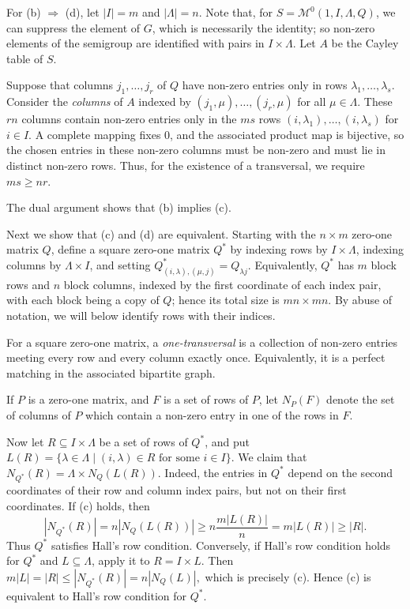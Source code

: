 \documentclass[11pt]{article}
\theoremstyle{plain}
\theoremstyle{remark}
\theoremstyle{definition}
\theoremstyle{plain}
\begin{document}
For (b) $\Rightarrow$ (d), let $|I|=m$ and $|\Lambda|=n$. Note
that, for $S=\mathcal{M}^0(1,I,\Lambda,Q)$, we can suppress the element of $G$,
which is necessarily the identity; so non-zero elements of the semigroup are identified with pairs in
$I\times\Lambda$. Let $A$ be the Cayley table of $S$.

Suppose that columns $j_1,\ldots,j_r$ of $Q$ have non-zero entries only in rows
$\lambda_1,\ldots,\lambda_s$. Consider the \emph{columns} of $A$ indexed
by $(j_1,\mu),\ldots,(j_r,\mu)$ for all $\mu\in\Lambda$. These $rn$ columns
contain non-zero entries only in the $ms$ rows $(i,\lambda_1),\ldots,(i,\lambda_s)$
for $i\in I$. A complete mapping fixes $0$, and the associated product map is
bijective, so the chosen entries in these non-zero columns must be non-zero and
must lie in distinct non-zero rows. Thus, for the existence of a transversal, we
require $ms\ge nr$.

The dual argument shows that (b) implies (c).

Next we show that (c) and (d) are equivalent. Starting with the
$n\times m$ zero-one matrix $Q$, define a square zero-one matrix $Q^*$ by indexing rows by $I\times\Lambda$, indexing columns by
$\Lambda\times I$, and setting
\(Q^*_{(i,\lambda),(\mu,j)}=Q_{\lambda j}.\)
Equivalently, $Q^*$ has $m$ block rows and $n$ block columns, indexed by the first coordinate of each index pair, with each block being
a copy of $Q$; hence its total size is $mn\times mn$. By abuse of notation, we will below identify rows with their indices.

For a square zero-one matrix, a \emph{one-transversal} is a collection of non-zero entries meeting every row and every column exactly once. Equivalently, it is a perfect matching in the associated bipartite graph.

If $P$ is a zero-one matrix, and $F$ is a set of rows of $P$, let $N_P(F)$ denote the set of columns of $P$ which contain a non-zero entry in
one of the rows in $F$.

Now let $R\subseteq I\times\Lambda$ be a set of rows of $Q^*$, and put
\(L(R)=\{\lambda\in\Lambda\mid(i,\lambda)\in R \text{ for some } i\in I\}.\)
We claim that
\(N_{Q^*}(R)=\Lambda\times N_Q(L(R)).\)
Indeed, the entries in $Q^*$ depend on the second coordinates of their
row and column index pairs, but not on their first coordinates.
If (c) holds, then
\[
        |N_{Q^*}(R)|=n|N_Q(L(R))|
        \ge n\frac{m|L(R)|}{n}=m|L(R)|\ge |R|.
\]
Thus $Q^*$ satisfies Hall's row condition. Conversely, if Hall's row condition
holds for $Q^*$ and $L\subseteq\Lambda$, apply it to
$R=I\times L$. Then
\(m|L|=|R|\le |N_{Q^*}(R)|=n|N_Q(L)|,\)
which is precisely (c). Hence (c) is equivalent to Hall's row condition for
$Q^*$.
\end{document}

